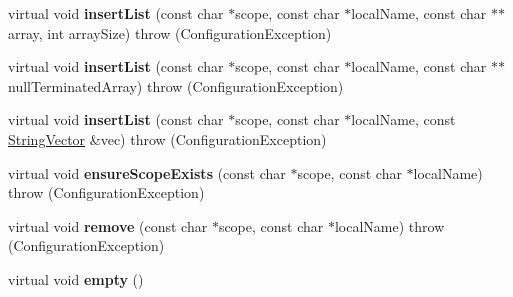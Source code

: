 \begin{DoxyCompactItemize}
\item 
\hypertarget{classCONFIG4CPP__NAMESPACE_1_1ConfigurationImpl_a7b970f3f5c23dafba3347f1a7b29855a}{virtual void {\bfseries insert\-List} (const char $\ast$scope, const char $\ast$local\-Name, const char $\ast$$\ast$array, int array\-Size)  throw (\-Configuration\-Exception)}\label{classCONFIG4CPP__NAMESPACE_1_1ConfigurationImpl_a7b970f3f5c23dafba3347f1a7b29855a}

\item 
\hypertarget{classCONFIG4CPP__NAMESPACE_1_1ConfigurationImpl_aaa149a693b09ea51a064314bac70c2a0}{virtual void {\bfseries insert\-List} (const char $\ast$scope, const char $\ast$local\-Name, const char $\ast$$\ast$null\-Terminated\-Array)  throw (\-Configuration\-Exception)}\label{classCONFIG4CPP__NAMESPACE_1_1ConfigurationImpl_aaa149a693b09ea51a064314bac70c2a0}

\item 
\hypertarget{classCONFIG4CPP__NAMESPACE_1_1ConfigurationImpl_a82254cddc60ae0f758d43a374cb4f192}{virtual void {\bfseries insert\-List} (const char $\ast$scope, const char $\ast$local\-Name, const \hyperlink{classCONFIG4CPP__NAMESPACE_1_1StringVector}{String\-Vector} \&vec)  throw (\-Configuration\-Exception)}\label{classCONFIG4CPP__NAMESPACE_1_1ConfigurationImpl_a82254cddc60ae0f758d43a374cb4f192}

\item 
\hypertarget{classCONFIG4CPP__NAMESPACE_1_1ConfigurationImpl_a974f1ea816052d3fd5d6764f4ad0ffe1}{virtual void {\bfseries ensure\-Scope\-Exists} (const char $\ast$scope, const char $\ast$local\-Name)  throw (\-Configuration\-Exception)}\label{classCONFIG4CPP__NAMESPACE_1_1ConfigurationImpl_a974f1ea816052d3fd5d6764f4ad0ffe1}

\item 
\hypertarget{classCONFIG4CPP__NAMESPACE_1_1ConfigurationImpl_a49499d890c2d4817b9113b531e8aad61}{virtual void {\bfseries remove} (const char $\ast$scope, const char $\ast$local\-Name)  throw (\-Configuration\-Exception)}\label{classCONFIG4CPP__NAMESPACE_1_1ConfigurationImpl_a49499d890c2d4817b9113b531e8aad61}

\item 
\hypertarget{classCONFIG4CPP__NAMESPACE_1_1ConfigurationImpl_a51b1a9ac4a60d538f054c1079d29e114}{virtual void {\bfseries empty} ()}\label{classCONFIG4CPP__NAMESPACE_1_1ConfigurationImpl_a51b1a9ac4a60d538f054c1079d29e114}

\end{DoxyCompactItemize}
